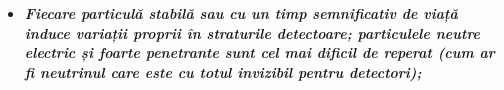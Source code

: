 \documentclass{beamer}
\begin{document}
\begin{frame}{}
\vspace{-3.5cm}
\small

\begin{itemize}
\item [\ding{55}] \makebox[0.5cm]{} \textit{\textbf{ Fiecare particulă stabilă sau cu un timp semnificativ de viață induce variații proprii în straturile detectoare; particulele neutre electric și foarte penetrante sunt cel mai dificil de reperat (cum ar fi neutrinul care este cu totul invizibil pentru detectori);}}
\end{itemize}




\end{frame}
\end{document}
